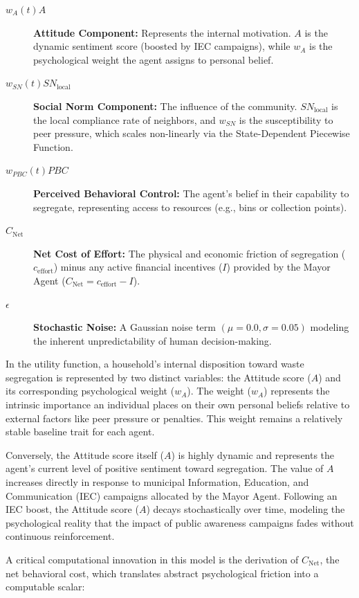\begin{description}
    \item[$w_A(t) A$] \textbf{Attitude Component:} Represents the internal motivation. $A$ is the dynamic sentiment score (boosted by IEC campaigns), while $w_A$ is the psychological weight the agent assigns to personal belief.
    \item[$w_{SN}(t) SN_{\mathrm{local}}$] \textbf{Social Norm Component:} The influence of the community. $SN_{\mathrm{local}}$ is the local compliance rate of neighbors, and $w_{SN}$ is the susceptibility to peer pressure, which scales non-linearly via the State-Dependent Piecewise Function.
    \item[$w_{PBC}(t) PBC$] \textbf{Perceived Behavioral Control:} The agent's belief in their capability to segregate, representing access to resources (e.g., bins or collection points).
    \item[$C_{\mathrm{Net}}$] \textbf{Net Cost of Effort:} The physical and economic friction of segregation ($c_{\text{effort}}$) minus any active financial incentives ($I$) provided by the Mayor Agent ($C_{\mathrm{Net}} = c_{\text{effort}} - I$).
    \item[$\epsilon$] \textbf{Stochastic Noise:} A Gaussian noise term $(\mu=0.0, \sigma=0.05)$ modeling the inherent unpredictability of human decision-making.
\end{description}

In the utility function, a household's internal disposition toward waste segregation is represented by two distinct variables: the Attitude score ($A$) and its corresponding psychological weight ($w_A$). The weight ($w_A$) represents the intrinsic importance an individual places on their own personal beliefs relative to external factors like peer pressure or penalties. This weight remains a relatively stable baseline trait for each agent.

Conversely, the Attitude score itself ($A$) is highly dynamic and represents the agent's current level of positive sentiment toward segregation. The value of $A$ increases directly in response to municipal Information, Education, and Communication (IEC) campaigns allocated by the Mayor Agent. Following an IEC boost, the Attitude score ($A$) decays stochastically over time, modeling the psychological reality that the impact of public awareness campaigns fades without continuous reinforcement.

A critical computational innovation in this model is the derivation of $C_{\mathrm{Net}}$, the net behavioral cost, which translates abstract psychological friction into a computable scalar:

